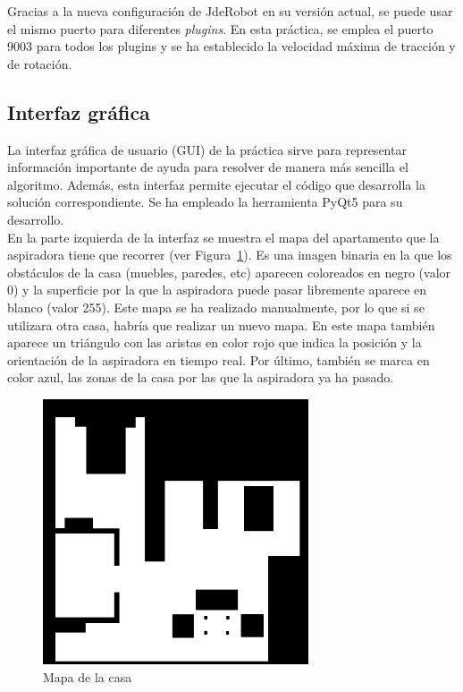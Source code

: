 Gracias a la nueva configuración de JdeRobot en su versión actual, se puede usar el mismo puerto para diferentes \textit{plugins}. En esta práctica, se emplea el puerto 9003 para todos los plugins y se ha establecido la velocidad máxima de tracción y de rotación.\\



\subsection{Interfaz gráfica}
La interfaz gráfica de usuario (GUI) de la práctica sirve para representar información importante de ayuda para resolver de manera más sencilla el algoritmo. Además, esta interfaz permite ejecutar el código que desarrolla la solución correspondiente. Se ha empleado la herramienta PyQt5 para su desarrollo.\\

En la parte izquierda de la interfaz se muestra el mapa del apartamento que la aspiradora tiene que recorrer (ver Figura~\ref{fig.mapa}). Es una imagen binaria en la que los obstáculos de la casa (muebles, paredes, etc) aparecen coloreados en negro (valor 0) y la superficie por la que la aspiradora puede pasar libremente aparece en blanco (valor 255). Este mapa se ha realizado manualmente, por lo que si se utilizara otra casa, habría que realizar un nuevo mapa. En este mapa también aparece un triángulo con las aristas en color rojo que indica la posición y la orientación de la aspiradora en tiempo real. Por último, también se marca en color azul, las zonas de la casa por las que la aspiradora ya ha pasado.

\begin{figure}[H]
  \begin{center}
    \includegraphics[width=0.7\textwidth]{figures/Vacuum/mapa.png}
		\caption{Mapa de la casa}
		\label{fig.mapa}
		\end{center}
\end{figure}


